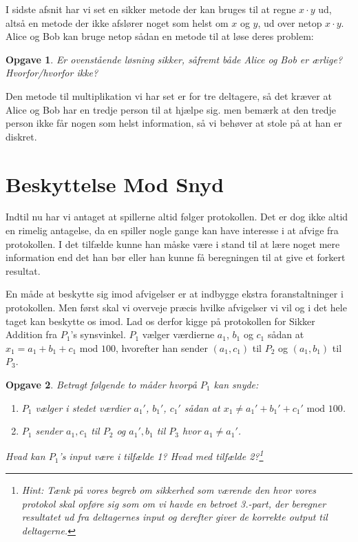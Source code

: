 \documentclass{article}
\theoremstyle{opgavedd}
\newtheorem{opgave}{Opgave}[section]
\newcommand\nsmod{\ensuremath{\text{ mod }}}
\begin{document}
I sidste afsnit har vi set en sikker metode der kan bruges til at regne $x\cdot y$ ud,
altså en metode der ikke afslører noget som helst om $x$ og $y$, ud over netop $x\cdot
y$. Alice og Bob kan bruge netop sådan en metode til at løse deres problem:

\begin{opgave}
  Er ovenstående løsning sikker, såfremt både Alice og Bob er ærlige? Hvorfor/hvorfor ikke?
\end{opgave}


Den metode til multiplikation vi har set er for tre deltagere, så det kræver at Alice og
Bob har en tredje person til at hjælpe sig. men bemærk at den tredje person ikke får nogen
som helst information, så vi behøver at stole på at han er diskret.

\newpage

\section{Beskyttelse Mod Snyd}
Indtil nu har vi antaget at spillerne altid følger protokollen. Det er dog ikke altid en
rimelig antagelse, da en spiller nogle gange kan have interesse i at afvige fra
protokollen. I det tilfælde kunne han måske være i stand til at lære noget mere
information end det han bør eller han kunne få beregningen til at give et forkert
resultat.

En måde at beskytte sig imod afvigelser er at indbygge ekstra foranstaltninger i
protokollen. Men først skal vi overveje præcis hvilke afvigelser vi vil og i det hele
taget kan beskytte os imod. Lad os derfor kigge på protokollen for Sikker Addition fra
$P_{1}$'s synsvinkel. $P_{1}$ vælger værdierne $a_{1}$, $b_{1}$ og $c_{1}$ sådan at
$x_{1}=a_{1}+b_{1}+c_{1}\nsmod{100}$, hvorefter han sender $(a_{1},c_{1})$ til $P_{2}$ og
$(a_{1},b_{1})$ til $P_{3}$.

\begin{opgave}
  Betragt følgende to måder hvorpå $P_{1}$ kan snyde:
  \begin{enumerate}
  \item $P_{1}$ vælger i stedet værdier $a_{1}'$, $b_{1}'$, $c_{1}'$ sådan at $x_{1}\neq
    a_{1}'+b_{1}'+c_{1}'\nsmod{100}$.
  \item $P_{1}$ sender $a_{1},c_{1}$ til $P_{2}$ og $a_{1}',b_{1}$ til $P_{3}$ hvor
    $a_{1}\neq a_{1}'$.
  \end{enumerate}
  Hvad kan $P_{1}$'s input være i tilfælde 1? Hvad med tilfælde 2?\footnote{Hint: Tænk på
    vores begreb om sikkerhed som værende den hvor vores protokol skal opføre sig som om
    vi havde en betroet 3.-part, der beregner resultatet ud fra deltagernes input og derefter
    giver de korrekte output til deltagerne.}
\end{opgave}
\end{document}

